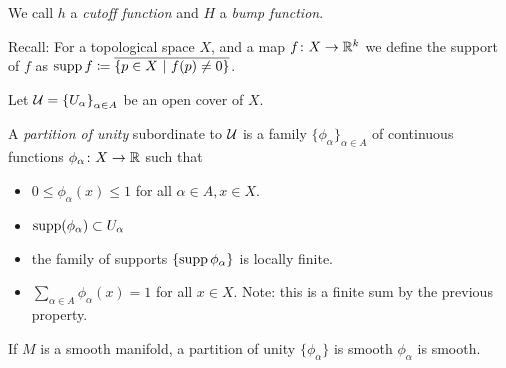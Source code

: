 \documentclass{skript}
\begin{document}
We call $h$ a \emph{cutoff function} and $H$ a \emph{bump function}.

Recall: For a topological space $X$, and a map $f\colon X\to \mathbb{R}^k$ we define the support of $f$ as $\operatorname{supp} f\coloneqq \overline{\left\{p\in X\ \middle|\  f(p) \neq 0\right\}}$.

Let $\mathcal{U}=\left\{U_\alpha\right\}_{\alpha\in A}$ be an open cover of $X$.
\begin{definition}
    A \emph{partition of unity} subordinate to $\mathcal{U}$ is a family $\{\phi_\alpha\}_{\alpha\in A}$ of continuous functions $\phi_\alpha\colon X\to \mathbb{R}$ such that
    \begin{itemize}
        \item
        $0\leq \phi_\alpha(x) \leq 1$ for all $\alpha\in A, x\in X$.
    \item
        $\operatorname{supp}(\phi_\alpha) \subset U_\alpha$
    \item
        the family of supports $\{\operatorname{supp} \phi_\alpha\}$ is locally finite.
    \item 
        $\sum_{\alpha\in A} \phi_\alpha(x) = 1$ for all $x\in X$. Note: this is a finite sum by the previous property.

    \end{itemize}
    If $M$ is a smooth manifold, a partition of unity $\{\phi_\alpha\}$ is smooth $\phi_\alpha$ is smooth.
\end{definition}





        



\printbibliography
\end{document}
